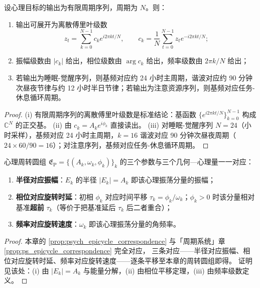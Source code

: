 \begin{theorem}[由心理数据构建周期级数]\label{thm:psych_series_reconstruction}
设心理目标的输出为有限周期序列，周期为 $N$。则：
\begin{enumerate}[label=(\roman*)]
    \item 输出可展开为离散傅里叶级数
    \[
    z_t=\sum_{k=0}^{N-1}c_k e^{i2\pi kt/N},\qquad
    c_k=\frac1N\sum_{t=0}^{N-1}z_t e^{-i2\pi kt/N};
    \]
    \item 振幅级数由 $|c_k|$ 给出，相位级数由 $\arg c_k$ 给出，频率级数由 $2\pi k/N$ 给出；
    \item 若输出为睡眠-觉醒序列，则基频对应约 24 小时主周期，谐波对应约 90 分钟次昼夜节律与约 12 小时半日节律；若输出为注意资源序列，则基频对应任务-休息循环周期。
\end{enumerate}
\end{theorem}

\begin{proof}
(i) 有限周期序列的离散傅里叶级数是标准结论：基函数 $\{e^{i2\pi kt/N}\}_{k=0}^{N-1}$ 构成 $\mathbb C^N$ 的正交基。
(ii) 由 $c_k=A_k e^{i\phi_k}$ 直接读出。
(iii) 对睡眠-觉醒序列 $N=24$（小时采样），基频对应 24 小时主周期，$k=16$ 谐波对应 90 分钟次昼夜周期（$24\times 60/90=16$）；对注意序列，基频对应任务-休息循环周期。
\end{proof}

\begin{proposition}\label{prop:psych_epicycle_correspondence}
心理周转圆组 $\mathfrak E_{\mathrm{P}}=\{(A_k,\omega_k,\phi_k)\}_{k}$ 的三个参数与三个几何—心理量一一对应：
\begin{enumerate}[label=(\roman*)]
    \item \textbf{半径对应振幅}：$E_k$ 的半径 $|E_k|=A_k$ 即该心理振荡分量的振幅；
    \item \textbf{相位对应旋转时延}：初相 $\phi_k$ 对应时间平移 $\tau_k=\phi_k/\omega_k$；$\phi_k>0$ 时该分量相对基准\textbf{超前} $\tau_k$（等价于把基准延后 $\tau_k$ 后二者重合）；
    \item \textbf{频率对应旋转速度}：$\omega_k$ 即该心理振荡分量的角频率。
\end{enumerate}
\end{proposition}

\begin{proof}
本章的 \cref{prop:psych_epicycle_correspondence} 与「周期系统」章 \cref{prop:ps_epicycle_correspondence} 完全对应，
三条对应——半径对应振幅、相位对应旋转时延、频率对应旋转速度——逐条平移至本章的周转圆组即得。
证明见该处：(i) 由 $|E_k|=A_k$ 与能量分解，(ii) 由相位平移定理，(iii) 由频率级数定义。
\end{proof}

